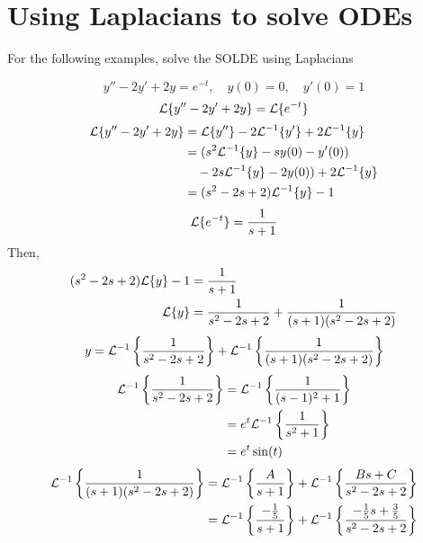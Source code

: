 \documentclass[diffeq.tex]{subfiles}
\begin{document}
    \section{Using Laplacians to solve ODEs}
    For the following examples, solve the SOLDE using Laplacians
    \begin{example}
        \begin{equation}
            y'' - 2y' + 2y = e^{-t},\quad y(0) = 0,\quad y'(0) = 1
        \end{equation}
        \begin{equation}
            \mathcal{L}\{y'' - 2y' + 2y\} = \mathcal{L}\{e^{-t}\}
        \end{equation}
        \begin{alignat}{1}
            \mathcal{L}\{y'' - 2y' + 2y\} &= \mathcal{L}\{y''\} - 2\mathcal{L}^{-1}\{y'\} + 2\mathcal{L}^{-1}\{y\}\\
            &= (s^{2}\mathcal{L}^{-1}\{y\} - sy(0) - y'(0))\\
            &\quad- 2s\mathcal{L}^{-1}\{y\} - 2y(0)) + 2\mathcal{L}^{-1}\{y\}\nonumber\\
            &= (s^{2} - 2s + 2)\mathcal{L}^{-1}\{y\} - 1
        \end{alignat}
        \begin{equation}
            \mathcal{L}\{e^{-t}\} = \frac{1}{s + 1}
        \end{equation}
        Then,
        \begin{alignat}{1}
            (s^{2} - 2s + 2)\mathcal{L}\{y\} - 1 &= \frac{1}{s + 1}\\
            \mathcal{L}\{y\} &= \frac{1}{s^{2} - 2s + 2} + \frac{1}{(s + 1)(s^{2}-2s + 2)}
        \end{alignat}
        \begin{equation}
            y = \mathcal{L}^{-1}\left\{\frac{1}{s^{2} - 2s + 2}\right\} + \mathcal{L}^{-1}\left\{\frac{1}{(s + 1)(s^{2}-2s + 2)}\right\}
        \end{equation}
        \begin{alignat}{1}
            \mathcal{L}^{-1}\left\{\frac{1}{s^{2} - 2s + 2}\right\} &= \mathcal{L}^{-1}\left\{\frac{1}{(s - 1)^{2} + 1}\right\}\\
            &= e^{t}\mathcal{L}^{-1}\left\{\frac{1}{s^{2} + 1}\right\}\\
            &= e^{t}\sin(t)
        \end{alignat}
        \begin{alignat}{1}
            \lci\left\{\frac{1}{(s + 1)(s^{2} - 2s + 2)}\right\} &= \lci\left\{\frac{A}{s + 1}\right\} + \lci\left\{\frac{Bs + C}{s^{2} - 2s + 2}\right\}\\
            &= \lci\left\{\frac{-\frac{1}{5}}{s + 1}\right\} + \lci\left\{\frac{-\frac{1}{5}s + \frac{3}{5}}{s^{2} - 2s + 2}\right\}\\

\end{alignat}
\end{example}
\end{document}

